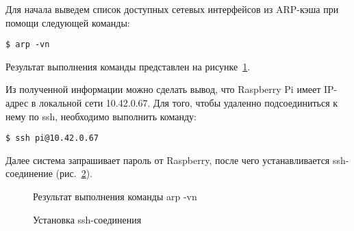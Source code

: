 Для начала выведем список доступных сетевых интерфейсов из ARP-кэша при помощи следующей команды:

\begin{verbatim}
$ arp -vn
\end{verbatim}

Результат выполнения команды представлен на рисунке~\ref{ssh_1:ssh_1}.

Из полученной информации можно сделать вывод, что Raspberry Pi имеет IP-адрес в локальной сети 10.42.0.67. Для того, чтобы удаленно подсоединиться к нему по ssh, необходимо выполнить команду: 

\begin{verbatim}
$ ssh pi@10.42.0.67
\end{verbatim}

Далее система запрашивает пароль от Raspberry, после чего устанавливается ssh-соединение (рис.~\ref{ssh_2:ssh_2}).


\begin{figure}[h!]
\caption{ Результат выполнения команды arp -vn }
\label{ssh_1:ssh_1}
\end{figure}

\begin{figure}[h!]
\caption{ Установка ssh-соединения }
\label{ssh_2:ssh_2}
\end{figure}

\clearpage
